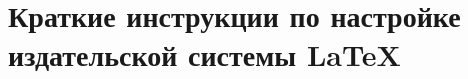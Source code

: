 \chapter{Краткие инструкции по настройке издательской системы \LaTeX}\label{appendix-MikTeX-TexStudio}							%

\NewPage %